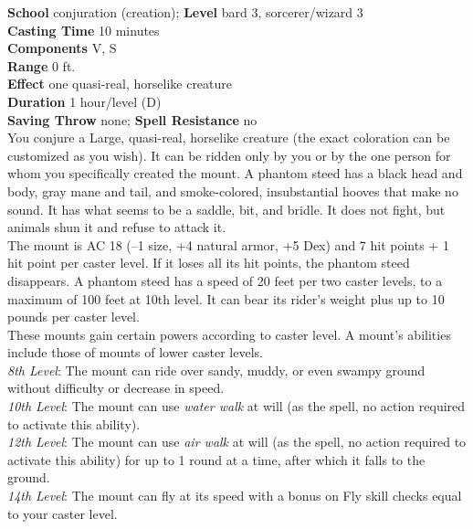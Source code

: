 \textbf{School} conjuration (creation); \textbf{Level} bard 3, sorcerer/wizard 3\\
\textbf{Casting Time} 10 minutes\\
\textbf{Components} V, S\\
\textbf{Range} 0 ft.\\
\textbf{Effect} one quasi-real, horselike creature\\
\textbf{Duration} 1 hour/level (D)\\
\textbf{Saving Throw} none; \textbf{Spell Resistance} no\\
You conjure a Large, quasi-real, horselike creature (the exact coloration can be customized as you wish). It can be ridden only by you or by the one person for whom you specifically created the mount. A phantom steed has a black head and body, gray mane and tail, and smoke-colored, insubstantial hooves that make no sound. It has what seems to be a saddle, bit, and bridle. It does not fight, but animals shun it and refuse to attack it.\\
The mount is AC 18 (--1 size, +4 natural armor, +5 Dex) and 7 hit points + 1 hit point per caster level. If it loses all its hit points, the phantom steed disappears. A phantom steed has a speed of 20 feet per two caster levels, to a maximum of 100 feet at 10th level. It can bear its rider's weight plus up to 10 pounds per caster level.\\
These mounts gain certain powers according to caster level. A mount's abilities include those of mounts of lower caster levels. \\
\textit{8th Level}: The mount can ride over sandy, muddy, or even swampy ground without difficulty or decrease in speed.\\
\textit{10th Level}: The mount can use \textit{water walk }at will (as the spell, no action required to activate this ability).\\
\textit{12th Level}: The mount can use \textit{air walk }at will (as the spell, no action required to activate this ability) for up to 1 round at a time, after which it falls to the ground.\\
\textit{14th Level}: The mount can fly at its speed with a bonus on Fly skill checks equal to your caster level.\\
